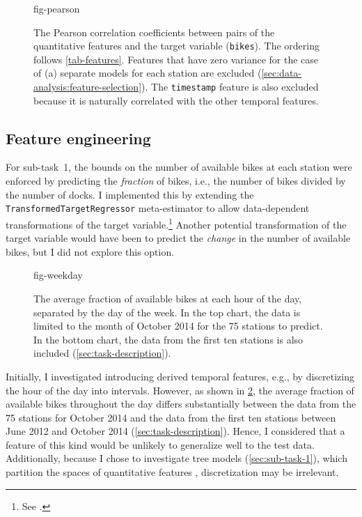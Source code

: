 \begin{figure}
  \centering
  {fig-pearson}
  \caption{
    The Pearson correlation coefficients between pairs of the quantitative features and
    the target variable (\texttt{bikes}).
    The ordering follows \cref{tab-features}.
    Features that have zero variance for the case of (a) separate models for each station
    are excluded (\cref{sec:data-analysis:feature-selection}).
    The \texttt{timestamp} feature is also excluded because it is naturally correlated with
    the other temporal features.
  }
  \label{fig-pearson}
\end{figure}

\subsection{Feature engineering}
\label{sec:data-analysis:feature-engineering}

For sub-task~1, the bounds on the number of available bikes at each station were
enforced by predicting the \emph{fraction} of bikes, i.e., the number of bikes divided
by the number of docks.
I implemented this by extending the \texttt{TransformedTargetRegressor} meta-estimator
to allow data-dependent transformations of the target variable.\footnote{See
  .
}
Another potential transformation of the target variable would have been to predict the
\emph{change} in the number of available bikes, but I did not explore this option.

\begin{figure}
  \centering
  {fig-weekday}
  \caption{The average fraction of available bikes at each hour of the day, separated by
    the day of the week.
    In the top chart, the data is limited to the month of October 2014 for the 75 stations
    to predict.
    In the bottom chart, the data from the first ten stations is also included
    (\cref{sec:task-description}).
  }
  \label{fig-weekday}
\end{figure}

Initially, I investigated introducing derived temporal features, e.g., by discretizing
the hour of the day into intervals.
However, as shown in \cref{fig-weekday}, the average fraction of available bikes
throughout the day differs substantially between the data from the 75 stations for
October 2014 and the data from the first ten stations between June 2012 and October
2014 (\cref{sec:task-description}).
Hence, I considered that a feature of this kind would be unlikely to generalize well to
the test data.
Additionally, because I chose to investigate tree models (\cref{sec:sub-task-1}), which
partition the spaces of quantitative features \parencite[155]{Flach2012},
discretization may be irrelevant.
